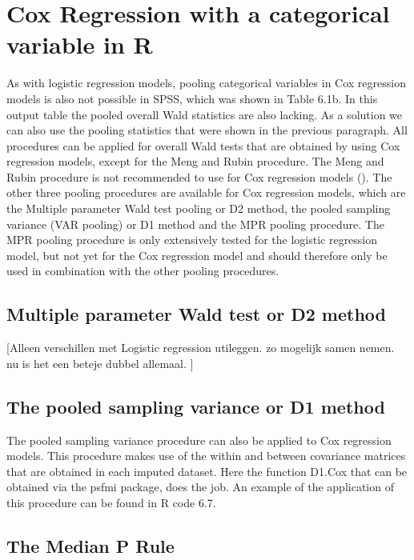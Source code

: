 \documentclass[]{book}
\begin{document}
\section{Cox Regression with a categorical variable in
R}\label{cox-regression-with-a-categorical-variable-in-r}

As with logistic regression models, pooling categorical variables in Cox
regression models is also not possible in SPSS, which was shown in Table
6.1b. In this output table the pooled overall Wald statistics are also
lacking. As a solution we can also use the pooling statistics that were
shown in the previous paragraph. All procedures can be applied for
overall Wald tests that are obtained by using Cox regression models,
except for the Meng and Rubin procedure. The Meng and Rubin procedure is
not recommended to use for Cox regression models
(\citet{Marshall2009MedResMeth}). The other three pooling procedures are
available for Cox regression models, which are the Multiple parameter
Wald test pooling or D2 method, the pooled sampling variance (VAR
pooling) or D1 method and the MPR pooling procedure. The MPR pooling
procedure is only extensively tested for the logistic regression model,
but not yet for the Cox regression model and should therefore only be
used in combination with the other pooling procedures.

\subsection{Multiple parameter Wald test or D2
method}\label{multiple-parameter-wald-test-or-d2-method-1}

{[}Alleen verschillen met Logistic regression utileggen. zo mogelijk
samen nemen. nu is het een beteje dubbel allemaal. {]}

\subsection{The pooled sampling variance or D1
method}\label{the-pooled-sampling-variance-or-d1-method-1}

The pooled sampling variance procedure can also be applied to Cox
regression models. This procedure makes use of the within and between
covariance matrices that are obtained in each imputed dataset. Here the
function D1.Cox that can be obtained via the psfmi package, does the
job. An example of the application of this procedure can be found in R
code 6.7.

\subsection{The Median P Rule}\label{the-median-p-rule-1}
\end{document}
